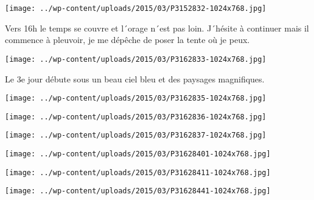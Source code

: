  

\begin{center} \texttt{[image: ../wp-content/uploads/2015/03/P3152832-1024x768.jpg]} \end{center}



 Vers 16h le temps se couvre et l´orage n´est pas loin. J´hésite à continuer mais il commence à pleuvoir, je me dépêche de poser la tente où je peux.

 

\begin{center} \texttt{[image: ../wp-content/uploads/2015/03/P3162833-1024x768.jpg]} \end{center}

 

 Le 3e jour débute sous un beau ciel bleu et des paysages magnifiques. 

 

\begin{center} \texttt{[image: ../wp-content/uploads/2015/03/P3162835-1024x768.jpg]} \end{center}



 

\begin{center} \texttt{[image: ../wp-content/uploads/2015/03/P3162836-1024x768.jpg]} \end{center}



 

\begin{center} \texttt{[image: ../wp-content/uploads/2015/03/P3162837-1024x768.jpg]} \end{center}



 

\begin{center} \texttt{[image: ../wp-content/uploads/2015/03/P31628401-1024x768.jpg]} \end{center}



 

\begin{center} \texttt{[image: ../wp-content/uploads/2015/03/P31628411-1024x768.jpg]} \end{center}



 

\begin{center} \texttt{[image: ../wp-content/uploads/2015/03/P31628441-1024x768.jpg]} \end{center}



